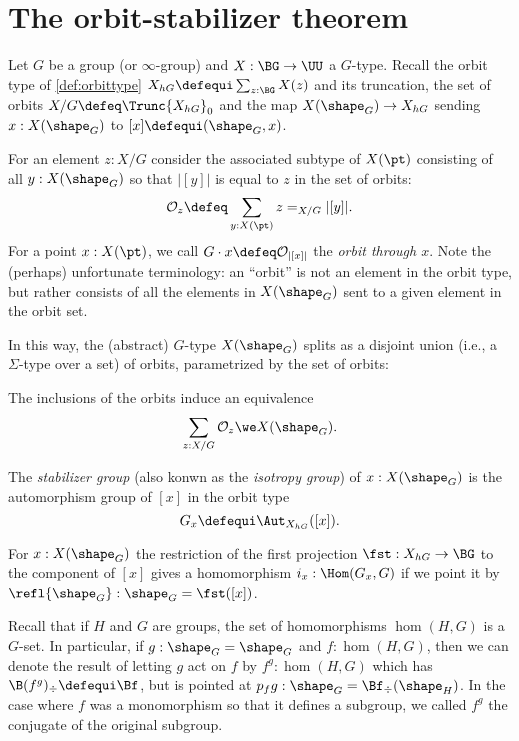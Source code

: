 \section{The orbit-stabilizer theorem}
\label{sec:orbit-stabilizer-theorem}


Let $G$ be a group (or $\infty$-group) and  $X : \BG \to \UU$  a $G$-type.
Recall the orbit type of \cref{def:orbittype} $X_{hG}\defequi
\sum_{z:\BG}X(z)$ and its truncation, the set of orbits $X / G \defeq \Trunc{X_{hG}}_0$ and the map $X(\shape_G)\to X_{hG}$ sending $x:X(\shape_G)$ to $[x]\defequi (\shape_G,x)$.

For an element $z:X/G$ consider the associated subtype of $X(\pt)$ consisting of
 all $y : X(\shape_G)$ so that $|[y]|$ is equal to $z$ in the set of orbits:
\[
  \mathcal O_{z} \defeq \sum_{y : X(\pt)} z =_{X/G} |[y]|.
\]
 For a point $x : X(\pt)$, we call $G\cdot x \defeq \mathcal O_{|[x]|}$ 
 the \emph{orbit through $x$}.
Note the (perhaps) unfortunate terminology: an ``orbit'' is not an element in the
orbit type, but rather consists of all the elements in $X(\shape_G)$ sent to a given element in the orbit set.

In this way, the (abstract) $G$-type $X(\shape_G)$ splits as a disjoint union (i.e., a $\Sigma$-type over a set) of orbits,
parametrized by the set of orbits:
\begin{lemma}
  \label{lem:splitting into orbits}
  The inclusions of the orbits induce an equivalence 
\[
  \sum_{z : X / G} \mathcal O_z  \we X(\shape_G).
\]
\end{lemma}

The \emph{stabilizer group}
(also konwn as the \emph{isotropy group}) of
$x : X(\shape_G)$ is the automorphism group of $[x]$ in the orbit type
$$G_x\defequi\Aut_{X_{hG}}([x]).$$

  For $x:X(\shape_G)$ the restriction of the first projection $\fst:X_{hG}\to\BG$ to the component of $[x]$ gives a homomorphism $i_x:\Hom(G_x,G)$ if we point it by $\refl{\shape_G}:\shape_G=\fst([x])$.

  Recall that if $H$ and $G$ are groups, the set of homomorphisms $\hom(H,G)$ is a $G$-set.  In particular, if $g:\shape_G=\shape_G$ and $f:\hom(H,G)$, then we can denote the result of letting $g$ act on $f$ by $f^g:\hom(H,G)$ which has $\B(f^g)_\div\defequi\Bf$, but is pointed at $p_fg:\shape_G=\Bf_\div(\shape_H)$.  In the case where $f$ was a monomorphism so that it defines a subgroup, we called $f^g$ the conjugate of the original subgroup.
  
